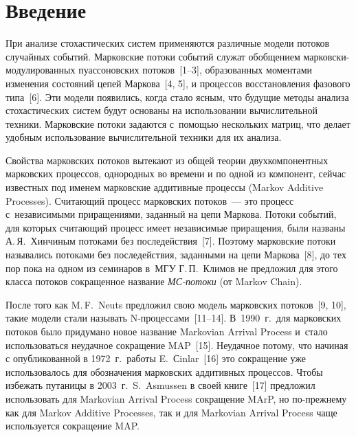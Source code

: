 { 
 



\thispagestyle{headings}

\begin{multicols}{2}

\label{st\stat}
  
\section{Введение}

    При анализе стохастических систем применяются различные модели потоков 
случайных событий. Марковские потоки событий служат обобщением 
марковски-модулированных пуассоновских потоков~[1--3], образованных 
моментами изменения состояний цепей Маркова~[4, 5], и процессов 
восстановления фазового типа~[6].  Эти модели появились, когда стало ясным, 
что будущие методы анализа стохастических систем будут основаны на 
использовании вычислительной техники. Марковские потоки задаются 
с~помощью нескольких матриц, что делает удобным использование 
вы\-чис\-ли\-тель\-ной техники для их анализа. 
    
Свойства марковских потоков вытекают из общей теории двухкомпонентных 
марковских процессов, однородных во времени и по одной из компонент, 
сейчас известных под именем марковские аддитивные процессы (Markov 
Additive Processes). Считающий процесс марковских потоков~--- это процесс 
с~независимыми приращениями, заданный на цепи Маркова. Потоки событий,  
для которых считающий процесс имеет независимые приращения, были 
названы А.\,Я.~Хинчиным потоками без последействия~[7]. Поэтому 
марковские потоки назывались потоками без последействия, заданными на 
цепи Маркова~[8], до тех пор пока на одном из семинаров в~МГУ 
Г.\,П.~Климов не предложил для этого класса потоков сокращенное название 
\textit{МС-по\-то\-ки} (от Markov Chain). 

После того как M.\,F.~Neuts предложил свою модель марковских потоков~[9, 
10], такие модели стали называть N-про\-цес\-са\-ми~[11--14]. В~1990~г.\ для 
марковских потоков было придумано новое название Markovian Arrival Process 
и~стало использоваться неудачное сокращение MAP~[15]. Неудачное потому, 
что начиная с опубликованной в 1972~г.\ работы E.~Сinlar~[16] это сокращение 
уже использовалось для обозначения марковских аддитивных процессов. 
Чтобы избежать путаницы в 2003~г.\ S.~Asmussen в своей книге~[17] 
предложил использовать для Markovian Arrival Process сокращение MArP, но 
по-прежнему как для Markov Additive Processes, так и для Markovian Arrival 
Process чаще используется сокращение MAP. 


\end{multicols}}
